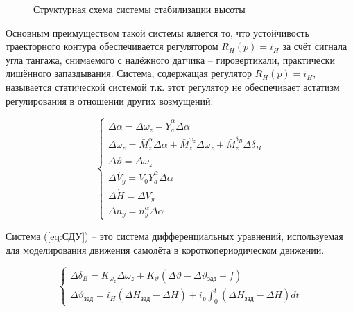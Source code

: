 \documentclass[a4paper,12pt]{article}
\begin{document}
\begin{figure}[H]
    \caption{Структурная схема системы стабилизации высоты}
    \label{fig:2}
\end{figure}

Основным преимуществом такой системы яляется то, что устойчивость траекторного контура обеспечивается 
регулятором $R_H(p)=i_H$ за счёт сигнала угла тангажа, снимаемого с надёжного датчика -- гировертикали, практически лишённого запаздывания.
Система, содержащая регулятор $R_H(p)=i_H$, называется статической системой т.к. этот регулятор не обеспечивает астатизм регулирования в отношении других возмущений. 


\begin{equation}
    \begin{cases}
        \Delta\dot{\alpha}=\Delta\omega_z-\bar{Y}^\alpha_a\Delta\alpha\\
        \Delta\dot{\omega_z} = \bar{M}^\alpha_z\Delta\alpha+\bar{M}^{\omega_z}_z\Delta\omega_z+\bar{M}^{\delta_B}_z\Delta\delta_B\\
        \Delta\dot{\vartheta} = \Delta\omega_z\\
        \Delta\dot{V_y}=V_0\bar{Y}^\alpha_a\Delta\alpha\\
        \Delta\dot{H}=\Delta V_y\\
        \Delta n_y=n^\alpha_y\Delta\alpha
    \end{cases}
    \label{eq:СДУ}
\end{equation}

Система (\ref{eq:СДУ}) -- это система дифференциальных уравнений, используемая для моделирования
движения самолёта в короткопериодическом движении. 

\begin{equation}
    \begin{cases}
        \Delta\delta_B=K_{\omega_z}\Delta\omega_z+K_{\vartheta}(\Delta\vartheta-\Delta\vartheta_\text{зад}+f)\\
        \Delta\vartheta_{\text{зад}} = i_H(\Delta H_{\text{зад}}-\Delta H)+i_p\int_{0}^{t}(\Delta H_{\text{зад}}-\Delta H)dt
    \end{cases}
    \label{eq:заданные значения}
\end{equation}
\end{document}
